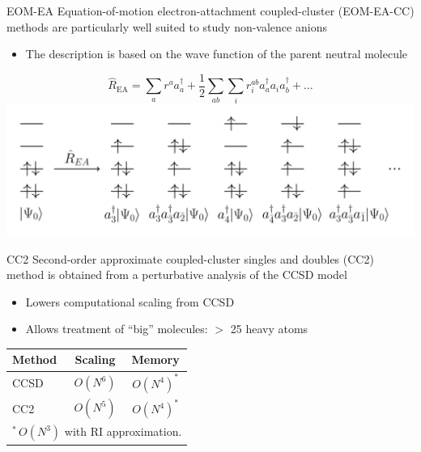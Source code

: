 \documentclass[9pt,t,xcolor=table]{beamer}
\begin{document}
\begin{frame}{\huge EOM-EA}\large
	Equation-of-motion electron-attachment coupled-cluster (EOM-EA-CC) methods are particularly well suited to study non-valence anions
	\vspace{5pt}
	\begin{itemize}
		\item The description is based on the wave function of the parent neutral molecule
	\end{itemize}
	\centering
	\vspace{5pt} 
			\[ \hat{R}_{\mathrm{EA}} = \sum_{a} r^a a_a^\dagger + \frac{1}{2} \sum_{ab} \sum_{i} r_{i}^{ab} a_a^\dagger a_i a_b^\dagger + \dots \]
	\includegraphics[width=\textwidth]{Figs/EOM_EA.pdf}
\end{frame}

\begin{frame}{\huge CC2}\large
	Second-order approximate coupled-cluster singles and doubles (CC2) method is obtained from a perturbative analysis of the CCSD model
	\vspace{5pt}
	\begin{itemize}
		\item Lowers computational scaling from CCSD 
		\item Allows treatment of “big” molecules: $>$ 25 heavy atoms
	\end{itemize}
	\centering
	\vspace{30pt}
	\begin{table}
		\centering
		\begin{tabular}{lcc}\toprule
		\textbf{Method} & \textbf{Scaling} & \textbf{Memory}\\\midrule
		CCSD & $O(N^6)$ & $O(N^{4})^*$\\
		CC2 & $O(N^5)$ & $O(N^{4})^*$\\\bottomrule
		\multicolumn{3}{l}{\small $^*\,O(N^3)$ with RI approximation.}
		\end{tabular}
	\end{table}
\end{frame}
\end{document}

